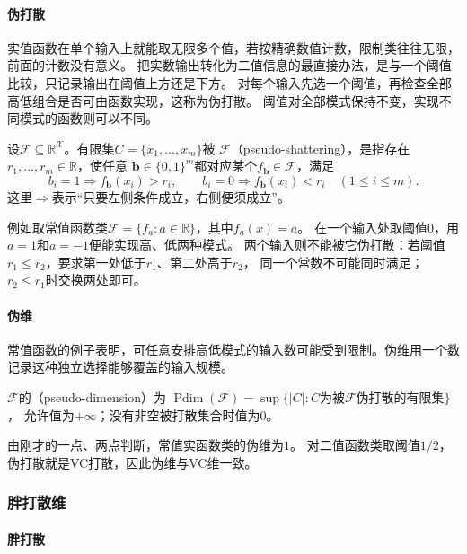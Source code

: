 \paragraph{伪打散}

实值函数在单个输入上就能取无限多个值，若按精确数值计数，限制类往往无限，前面的计数没有意义。
把实数输出转化为二值信息的最直接办法，是与一个阈值比较，只记录输出在阈值上方还是下方。
对每个输入先选一个阈值，再检查全部高低组合是否可由函数实现，这称为伪打散。
阈值对全部模式保持不变，实现不同模式的函数则可以不同。
\begin{definition}[伪打散]
\label{def:pseudo-shattering}
设$\mathcal F\subseteq\mathbb R^{\mathcal X}$。有限集$C=\{x_1,\ldots,x_m\}$被
$\mathcal F$（pseudo-shattering），是指存在$r_1,\ldots,r_m\in\mathbb R$，使任意
$\bm b\in\{0,1\}^m$都对应某个$f_{\bm b}\in\mathcal F$，满足
\[
 b_i=1\Rightarrow f_{\bm b}(x_i)>r_i,\qquad
 b_i=0\Rightarrow f_{\bm b}(x_i)<r_i\quad(1\leq i\leq m).
\]
这里$\Rightarrow$表示“只要左侧条件成立，右侧便须成立”。
\end{definition}

例如取常值函数类$\mathcal F=\{f_a:a\in\mathbb R\}$，其中$f_a(x)=a$。
在一个输入处取阈值$0$，用$a=1$和$a=-1$便能实现高、低两种模式。
两个输入则不能被它伪打散：若阈值$r_1\leq r_2$，要求第一处低于$r_1$、第二处高于$r_2$，
同一个常数不可能同时满足；$r_2\leq r_1$时交换两处即可。

\paragraph{伪维}

常值函数的例子表明，可任意安排高低模式的输入数可能受到限制。伪维用一个数记录这种独立选择能够覆盖的输入规模。

\begin{definition}[伪维]
\label{def:pseudo-dimension}
$\mathcal F$的（pseudo-dimension）为
$\operatorname{Pdim}(\mathcal F)=\sup\{|C|:C\text{为被}\mathcal F\text{伪打散的有限集}\}$，
允许值为$+\infty$；没有非空被打散集合时值为$0$。
\end{definition}

由刚才的一点、两点判断，常值实函数类的伪维为$1$。
对二值函数类取阈值$1/2$，伪打散就是VC打散，因此伪维与VC维一致。

\subsubsection{胖打散维}
\label{sec:comb-margin-patterns}

\paragraph{胖打散}

